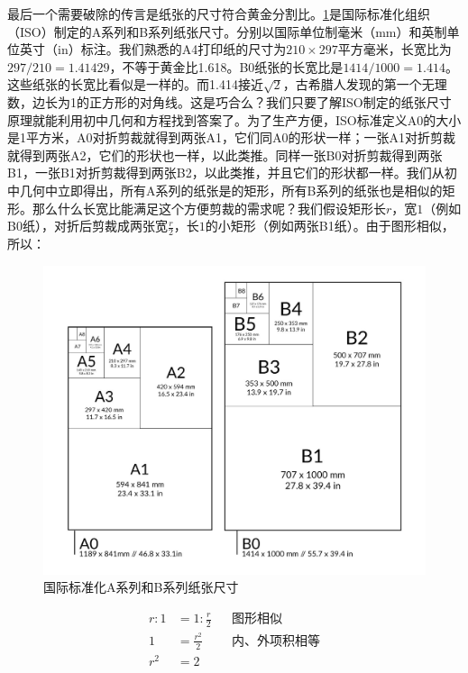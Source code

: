 \documentclass[b5paper]{ctexart}
\begin{document}
最后一个需要破除的传言是纸张的尺寸符合黄金分割比。\cref{fig:ISO216}是国际标准化组织（ISO）制定的A系列和B系列纸张尺寸。分别以国际单位制毫米（mm）和英制单位英寸（in）标注。我们熟悉的A4打印纸的尺寸为$210 \times 297$平方毫米，长宽比为$297/210 = 1.41429$，不等于黄金比1.618。B0纸张的长宽比是$1414/1000 = 1.414$。这些纸张的长宽比看似是一样的。而1.414接近$\sqrt{2}$，古希腊人发现的第一个无理数，边长为1的正方形的对角线。这是巧合么？我们只要了解ISO制定的纸张尺寸原理就能利用初中几何和方程找到答案了。为了生产方便，ISO标准定义A0的大小是1平方米，A0对折剪裁就得到两张A1，它们同A0的形状一样；一张A1对折剪裁就得到两张A2，它们的形状也一样，以此类推。同样一张B0对折剪裁得到两张B1，一张B1对折剪裁得到两张B2，以此类推，并且它们的形状都一样。我们从初中几何中立即得出，所有A系列的纸张是的矩形，所有B系列的纸张也是相似的矩形。那么什么长宽比能满足这个方便剪裁的需求呢？我们假设矩形长$r$，宽$1$（例如B0纸），对折后剪裁成两张宽$\frac{r}{2}$，长$1$的小矩形（例如两张B1纸）。由于图形相似，所以：

\begin{figure}[htbp]
 \centering
 \includegraphics[scale=0.25]{img/ISO216}
 \caption{国际标准化A系列和B系列纸张尺寸}
 \label{fig:ISO216}
\end{figure}

\begin{align*}
r : 1 &= 1 : \frac{r}{2}  && \text{图形相似} \\
1 &= \frac{r^2}{2} && \text{内、外项积相等} \\
r^2 &= 2
\end{align*}
\end{document}
